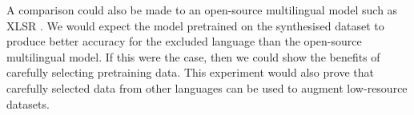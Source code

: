 A comparison could also be made to an open-source multilingual model such as XLSR \cite{XLSR-53, babu2021xlsr}. We would expect the model pretrained on the synthesised dataset to produce better accuracy for the excluded language than the open-source multilingual model. If this were the case, then we could show the benefits of carefully selecting pretraining data. This experiment would also prove that carefully selected data from other languages can be used to augment low-resource datasets.




